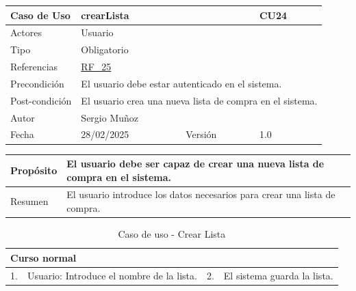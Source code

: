 \begin{table}[H]
    \centering
    \begin{tabular}{| m{} | m{} | m{} | m{} |}
        \hline
        \rowcolor[HTML]{C0C0C0} Caso de Uso & \multicolumn{2}{|m{0.43\textwidth}|}{crearLista} &  CU24\\ 
        \hline
        Actores & \multicolumn{3}{l|}{Usuario} \\ 
        \hline
        Tipo & \multicolumn{3}{l|}{Obligatorio} \\ 
        \hline
        Referencias & \multicolumn{3}{l|}{\hyperref[req:RF25]{RF\_25}} \\ 
        \hline
        Precondición & \multicolumn{3}{m{0.67\textwidth}|}{El usuario debe estar autenticado en el sistema.} \\ 
        \hline
        Post-condición & \multicolumn{3}{m{0.67\textwidth}|}{El usuario crea una nueva lista de compra en el sistema.} \\ 
        \hline
        Autor & \multicolumn{3}{l|}{Sergio Muñoz} \\ 
        \hline
        Fecha & 28/02/2025 & Versión & 1.0 \\ 
        \hline
    \end{tabular}
\end{table}

\begin{table}[H]
    \centering
    \begin{tabular}{| m{} | m{} | m{} | m{} |}
        \hline
        Propósito & \multicolumn{3}{m{0.67\textwidth}|}{El usuario debe ser capaz de crear una nueva lista de compra en el sistema.} \\ 
        \hline
        Resumen & \multicolumn{3}{m{0.67\textwidth}|}{El usuario introduce los datos necesarios para crear una lista de compra.} \\ 
        \hline
    \end{tabular}
\end{table}

\begin{table}[H]
    \centering
    \begin{tabular}{| m{} | m{} | m{} | m{} |}
        \hline
        \multicolumn{4}{|m{0.9\textwidth}|}{Curso normal} \\ 
        \hline
        1. & Usuario: Introduce el nombre de la lista. 
        & 2. & El sistema guarda la lista. \\ 
        \hline
    \end{tabular}
    \caption{Caso de uso - Crear Lista}
\end{table}

